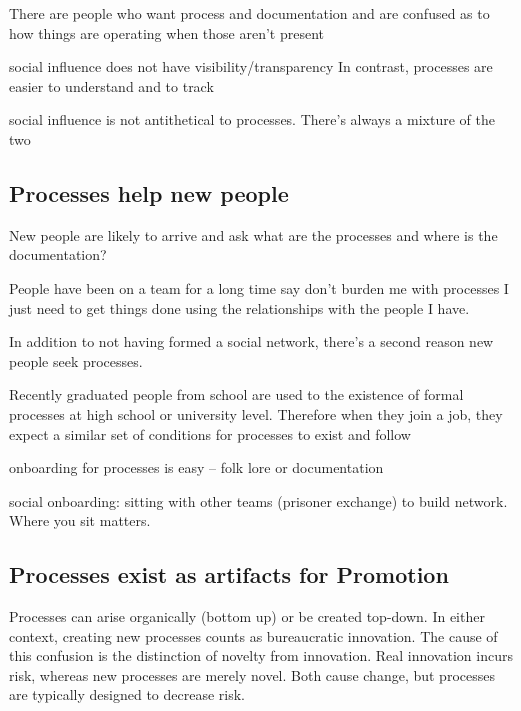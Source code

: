 There are people who want process and documentation and are confused as to how things are operating when those aren't present


social influence does not have visibility/transparency
In contrast, processes are easier to understand and to track

social influence is not antithetical to processes. There's always a mixture of the two


\subsection*{Processes help new people}

New people are likely to arrive and ask what are the processes and where is the documentation?

People have been on a team for a long time say don't burden me with processes I just need to get things done using the relationships with the people I have.

In addition to not having formed a social network, there's a second reason new people seek processes.

Recently graduated people from school are used to the existence of formal processes at high school or university level. Therefore when they join a job, they expect a similar set of conditions for processes to exist and follow

onboarding for processes is easy -- folk lore or documentation

social onboarding: sitting with other teams (prisoner exchange) to build network.
Where you sit matters.

\subsection*{Processes exist as artifacts for Promotion}

Processes can arise organically (bottom up) or be created top-down. In either context, creating new processes counts as bureaucratic innovation. The cause of this confusion is the distinction of novelty from innovation. Real innovation incurs risk, whereas new processes are merely novel. Both cause change, but processes are typically designed to decrease risk. 

